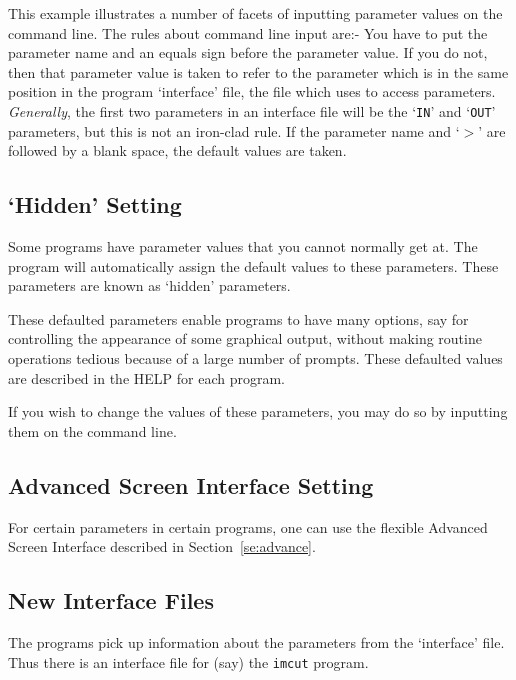 This example illustrates a number of facets of inputting parameter
values on the command line. The rules about command line input are:-
You have to put the parameter name and an equals sign before the
parameter value. If you do not, then that parameter value is taken to
refer to the parameter which is in the same position in the program
`interface' file, the file which \starman uses to access parameters.
{\em Generally}, the first two parameters in an interface file will be
the `\verb|IN|' and `\verb|OUT|' parameters, but this is not an
iron-clad rule. If the parameter name and `$>$' are followed by a blank
space, the default values are taken.

\subsection{`Hidden' Setting}

Some programs have parameter values that you cannot normally get at.
The program will automatically assign the default values to these
parameters.  These parameters are known as `hidden' parameters.

These defaulted parameters enable programs to have many options, say
for controlling the appearance of some graphical output, without making
routine operations tedious because of a large number of prompts. These
defaulted values are described in the HELP for each program.

If you wish to change the values of these parameters, you may do so by
inputting them on the command line.


\subsection{Advanced Screen Interface Setting}

For certain parameters in certain programs, one can use the flexible
Advanced Screen Interface described in Section~\ref{se:advance}.

\subsection{New Interface Files}

The \starman programs pick up information about the parameters from the
`interface' file. Thus there is an interface file for (say) the
\verb|imcut| program.

